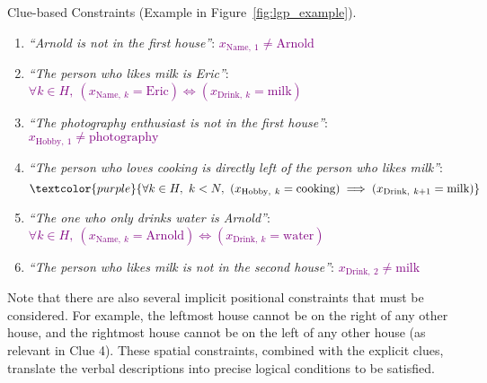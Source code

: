 \begin{AIbox}{Clue-based Constraints (Example in Figure~\ref{fig:lgp_example}).}
    \small 
    \begin{enumerate}[label=\textbf{Clue \arabic*.}, leftmargin=3em, itemsep=0em]
        \item \textit{``Arnold is not in the first house''}: \textcolor{purple}{\( x_{\text{Name},\ 1} \ne \text{Arnold} \)}
        \item \textit{``The person who likes milk is Eric''}:  
            \textcolor{purple}{$\forall k \in H,\ (x_{\text{Name},\ k} = \text{Eric}) \iff (x_{\text{Drink},\ k} = \text{milk})$}
        \item \textit{``The photography enthusiast is not in the first house''}: \textcolor{purple}{\( x_{\text{Hobby},\ 1} \ne \text{photography} \)}
        \item \textit{``The person who loves cooking is directly left of the person who likes milk''}:  
            \begingroup
            \setlength{\abovedisplayskip}{0pt}
            \setlength{\belowdisplayskip}{0pt}
            \[ \textcolor{purple}{\forall k \in H,\ k < N,\ (x_{\text{Hobby},\ k} = \text{cooking}) \implies (x_{\text{Drink},\ k+1} = \text{milk})} \] 
            \endgroup 
        \item \textit{``The one who only drinks water is Arnold''}: \textcolor{purple}{$\forall k \in H,\ (x_{\text{Name},\ k} = \text{Arnold}) \iff (x_{\text{Drink},\ k} = \text{water})$}
        \item \textit{``The person who likes milk is not in the second house''}: \textcolor{purple}{\( x_{\text{Drink},\ 2} \ne \text{milk} \)}
    \end{enumerate}
\end{AIbox}

 
Note that there are also several implicit positional constraints that must be considered. For example, the leftmost house cannot be on the right of any other house, and the rightmost house cannot be on the left of any other house (as relevant in Clue 4). These spatial constraints, combined with the explicit clues, translate the verbal descriptions into precise logical conditions to be satisfied.




